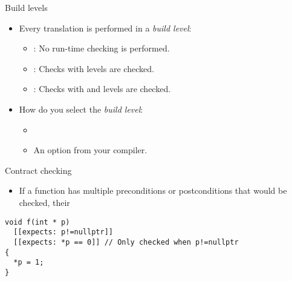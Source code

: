 \begin{frame}[t]{Build levels}
\begin{itemize}
  \item Every translation is performed in a \emph{build level}:
    \begin{itemize}
      \item {}: No run-time checking is performed.
      \item {}: Checks with  levels are checked.
      \item {}: Checks with  and 
levels are checked.
    \end{itemize}
  
  \vfill\pause
  \item How do you select the \emph{build level}:
    \begin{itemize}
      \item {}
      \item An option from your compiler.
    \end{itemize}
\end{itemize}
\end{frame}

\begin{frame}[t,fragile]{Contract checking}
\begin{itemize}
\item If a function has multiple preconditions or postconditions
that would be checked, their 
\end{itemize}

\vfill\pause
\begin{lstlisting}
void f(int * p)
  [[expects: p!=nullptr]]
  [[expects: *p == 0]] // Only checked when p!=nullptr
{
  *p = 1;
}
\end{lstlisting}
\end{frame}

